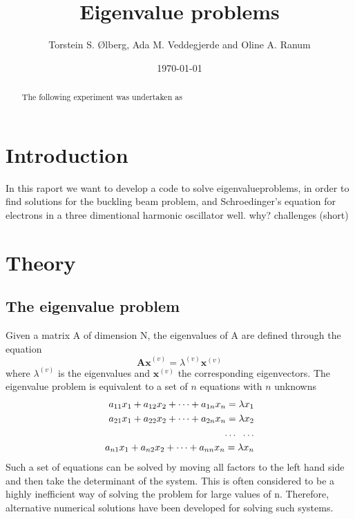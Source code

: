 \documentclass[%
reprint,
amsmath, 
amssymb, 
aps,]{revtex4-1}
\begin{document}
\title{Eigenvalue problems}
\author{Torstein S. Ølberg, Ada M. Veddegjerde and Oline A. Ranum}
\date{\today}


\begin{abstract}
	The following experiment was undertaken as
\end{abstract}
\maketitle

	\section*{Introduction}
In this raport we want to develop a code to solve eigenvalueproblems, in order to find solutions for the buckling beam problem, and Schroedinger's equation for electrons in a three dimentional harmonic oscillator well.
why? challenges (short)

	\section*{Theory}
		\subsection{The eigenvalue problem} \noindent 
Given a matrix A of dimension N, the eigenvalues of A are defined through the equation
			\begin{equation}\label{eigenval}
	\mathbf{Ax}^{(v)} = \lambda^{(v)}\mathbf{x}^{(v)}
			\end{equation}
where $\lambda^{(v)}$ is the eigenvalues and $\mathbf{x}^{(v)}$ the corresponding eigenvectors. The eigenvalue problem is equivalent to a set of $n$ equations with $n$ unknowns 
			\begin{align*}
	a_{11}x_1 + a_{12}x_2 +\dots + a_{1n}x_n = \lambda x_1 \\a_{21}x_1 + a_{22}x_2 +\dots + a_{2n}x_n = \lambda x_2 \\ \dots \hspace{2mm} \dots \\
	a_{n1}x_1 + a_{n2}x_2 +\dots + a_{nn}x_n = \lambda x_n \\
			\end{align*}
Such a set of equations can be solved by moving all factors to the left hand side and then take the determinant of the system. This is often considered to be a highly inefficient way of solving the problem for large values of n. Therefore, alternative numerical solutions have been developed for solving such systems. 
\end{document}
